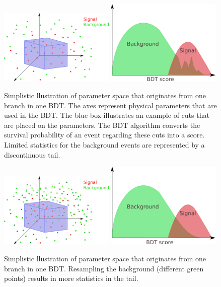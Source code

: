 \begin{appendices}
\begin{figure}
\centering
\includegraphics[width=0.49\textwidth]{appendix/img/resampling_before.png}
\includegraphics[width=0.49\textwidth]{appendix/img/hist1.png}
\caption{Simplistic llustration of parameter space that originates from one branch in one BDT. The axes represent physical parameters that are used in the BDT. The blue box illustrates an example of cuts that are placed on the parameters. The BDT algorithm converts the survival probability of an event regarding these cuts into a score. Limited statistics for the background events are represented by a discontinuous tail.}
\label{fig:pvillustration1}
\end{figure}

\begin{figure}
\centering
\includegraphics[width=0.49\textwidth]{appendix/img/resampling_after.png}
\includegraphics[width=0.49\textwidth]{appendix/img/hist2.png}
\caption{Simplistic llustration of parameter space that originates from one branch in one BDT. Resampling the background (different green points) results in more statistics in the tail.}
\label{fig:pvillustration2}
\end{figure}


\end{appendices}
